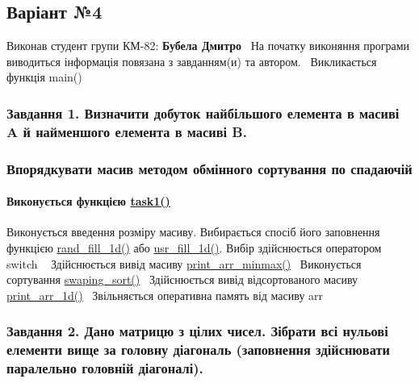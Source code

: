 \begin{center} \subsection*{Варіант №4}\end{center} 

\begin{center} \end{center}  Виконав студент групи КМ-\/82\+: {\bfseries Бубела Дмитро}~\newline
 На початку виконяння програми виводиться інформація пов\textquotesingle{}язана з завданням(и) та автором.~\newline
Викликається функція main() \subsubsection*{Завдання 1. Визначити добуток найбільшого елемента в масиві A й найменшого елемента в масиві B.}

\subsubsection*{Впорядкувати масив методом обмінного сортування по спадаючій}

\paragraph*{Виконується функцією \hyperlink{main_8c_afde07648040c326129670547738a0c86}{task1()}}

Виконується введення розміру масиву. Вибирається спосіб його заповнення функцією \hyperlink{main_8c_a59de3507f445b58bf9f31f121f1dd53e}{rand\+\_\+fill\+\_\+1d()} або \hyperlink{main_8c_a754c278f22020e77d09cda28d2e18f4e}{usr\+\_\+fill\+\_\+1d()}. Вибір здійснюється оператором {\ttfamily switch} ~\newline
 Здійснюється вивід масиву \hyperlink{main_8c_a954f537fd937eb56b052549a1e3b4be4}{print\+\_\+arr\+\_\+minmax()}~\newline
Виконується сортування \hyperlink{main_8c_a6d948aa7c7e64009c7446e8010368f74}{swaping\+\_\+sort()}~\newline
Здійснюється вивід відсортованого масиву \hyperlink{main_8c_afa0f71f47bb3b8336377d2c3972613ff}{print\+\_\+arr\+\_\+1d()}~\newline
Звільняється оперативна пам\textquotesingle{}ять від масиву {\ttfamily arr} \subsubsection*{Завдання 2. Дано матрицю з цілих чисел. Зібрати всі нульові елементи вище за головну діагональ (заповнення здійснювати паралельно головній діагоналі).}

